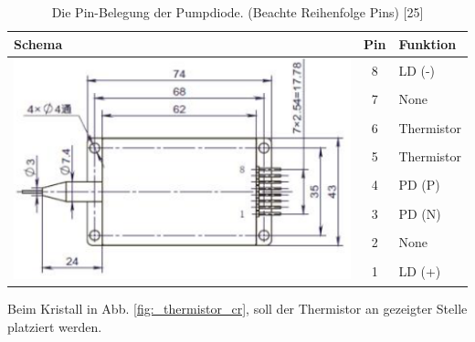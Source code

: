 \begin{table}[H]
    \centering
    \begin{tabular}{l|c|l}
         \textbf{Schema}&     \textbf{Pin}&      \textbf{Funktion}\\
         \hline
         \multirow{8}{*}{\includegraphics[scale=0.6]{98_images/pumpdiode_pins.PNG}}&8&LD (-)\\
         &                  7&                          None\\
         &                  6&                          Thermistor\\
         &                  5&                          Thermistor\\
         &                  4&                          PD (P)\\
         &                  3&                          PD (N)\\
         &                  2&                          None\\
         &                  1&                          LD (+)\\
    \end{tabular}
    \caption{Die Pin-Belegung der Pumpdiode. (Beachte Reihenfolge Pins) [25]}
    \label{tab:_pump_pins}
\end{table}

Beim Kristall in Abb. \ref{fig:_thermistor_cr}, soll der Thermistor an gezeigter Stelle platziert werden.

